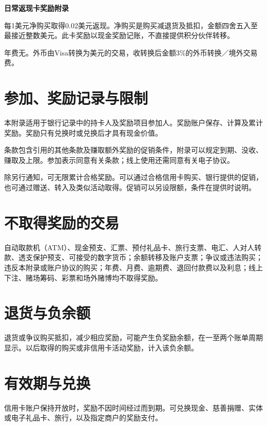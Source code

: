 \documentclass[UTF8,fontset=none,11pt,a4paper]{ctexart}
\begin{document}
{\noindent\fontsize{20}{25}\selectfont\bfseries 日常返现卡奖励附录\par}
\vspace{10pt}
每1美元净购买取得0.02美元返现。净购买是购买减退货及抵扣，金额四舍五入至最接近整数美元。此卡奖励以现金奖励记账，不直接提供积分\allowbreak\mbox{伙伴转移。}


年费无。外币由Visa转换为美元的交易，收转换后金额3\%的外币转换／境\allowbreak\mbox{外交易费。}


\section*{参加、奖励记录与限制}
本附录适用于银行记录中的持卡人及奖励项目参加人。奖励账户保存、计算及累计奖励。奖励只有兑换时或兑换后才具有\allowbreak\mbox{现金价值。}


条款包含引用的其他条款及赚取额外奖励的促销条件，附录可以规定到期、没收、赚取及上限。参加表示同意有关条款；线上使用还需同意有关\allowbreak\mbox{电子协议。}


除另行通知，可无限累计合格奖励。可以通过合格信用卡购买、银行提供的促销，也可通过赠送、转入及类似活动取得。促销可以另设限额，条件在提\allowbreak\mbox{供时说明。}


\section*{不取得奖励的交易}
自动取款机（ATM）、现金预支、汇票、预付礼品卡、旅行支票、电汇、人对人转款、透支保护预支、可接受的数字货币；余额转移及账户支票；争议或违法购买；违反本附录或账户协议的购买；年费、月费、逾期费、退回付款费以及利息；线上下注、赌场筹码、彩票和场外赌博均不取\allowbreak\mbox{得奖励。}


\section*{退货与负余额}
退货或争议购买抵扣，减少相应奖励，可能产生负奖励余额，在一至两个账单周期显示。以后取得的购买或非信用卡活动奖励，计入\allowbreak\mbox{该负余额。}


\section*{有效期与兑换}
信用卡账户保持开放时，奖励不因时间经过而到期。可兑换现金、慈善捐赠、实体或电子礼品卡、旅行，以及指定商户的\allowbreak\mbox{奖励支付。}
\end{document}
